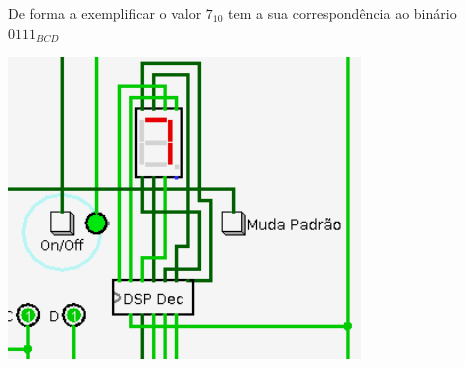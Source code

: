 \documentclass[12pt,a4paper,portrait]{article}
\begin{document}
			\begin{minipage}{1.1\textwidth}
				\begin{minipage}[b]{0.49\textwidth}
					De forma a exemplificar o valor $7_{10}$ tem a sua correspondência ao binário $0111_{BCD}$\\
				\end{minipage}
				\hfill
				\begin{minipage}[b]{0.49\textwidth}
					\centering
					\includegraphics[width=0.7\textwidth]{imagens/7dispon}
				\end{minipage}
			\end{minipage}\\
\end{document}
